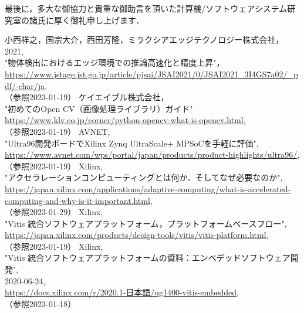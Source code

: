 \documentclass[11pt,a4j]{jreport}
\begin{document}
最後に，多大な御協力と貴重な御助言を頂いた計算機/ソフトウェアシステム研究室の諸氏に厚く御礼申し上げます．
\renewcommand{\bibname}{参考文献} %
\begin{thebibliography}{99}
   小西祥之，国宗大介，西田芳隆，ミラクシアエッジテクノロジー株式会社， \\2021, \\"物体検出におけるエッジ環境での推論高速化と精度上昇"， \\\url{https://www.jstage.jst.go.jp/article/pjsai/JSAI2021/0/JSAI2021_3I4GS7a02/_pdf/-char/ja}, \\（参照2023-01-19）
   ケイエイブル株式会社， \\"初めてのOpen CV（画像処理ライブラリ）ガイド" \\\url{https://www.klv.co.jp/corner/python-opencv-what-is-opencv.html}, \\（参照2023-01-19）
   AVNET, \\"Ultra96開発ボードでXilinx Zynq UltraScale+ MPSoCを手軽に評価", \\\url{https://www.avnet.com/wps/portal/japan/products/product-highlights/ultra96/}, \\（参照2023-01-19）
   Xilinx, \\"アクセラレーションコンピューティングとは何か．そしてなぜ必要なのか", \\\url{https://japan.xilinx.com/applications/adaptive-computing/what-is-accelerated-computing-and-why-is-it-important.html}, \\（参照2023-01-29）
   Xilinx, \\"Vitis 統合ソフトウェアプラットフォーム，プラットフォームベースフロー", \\\url{https://japan.xilinx.com/products/design-tools/vitis/vitis-platform.html}, \\（参照2023-01-19）
   Xilinx, \\"Vitis 統合ソフトウェアプラットフォームの資料：エンベデッドソフトウェア開発", \\2020-06-24, \\\url{https://docs.xilinx.com/r/2020.1-日本語/ug1400-vitis-embedded}, \\（参照2023-01-18）

\end{thebibliography}
\end{document}
